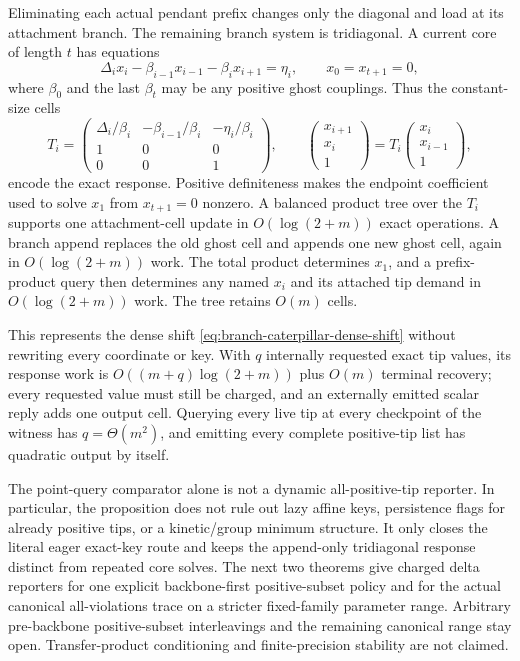 \begin{remark}
\label{rem:branch-caterpillar-implicit-transfer-comparator}
Eliminating each actual pendant prefix changes only the diagonal and load at
its attachment branch.  The remaining branch system is tridiagonal.  A
current core of length $t$ has equations
\begin{equation*}
 \Delta_i x_i-\beta_{i-1}x_{i-1}-\beta_i x_{i+1}=\eta_i,
 \qquad x_0=x_{t+1}=0,
\end{equation*}
where $\beta_0$ and the last $\beta_t$ may be any positive ghost couplings.
Thus the
constant-size cells
\begin{equation*}
 T_i=
 \begin{pmatrix}
  \Delta_i/\beta_i&-\beta_{i-1}/\beta_i&-\eta_i/\beta_i\\
  1&0&0\\0&0&1
 \end{pmatrix},
 \qquad
 \begin{pmatrix}x_{i+1}\\x_i\\1\end{pmatrix}
 =T_i\begin{pmatrix}x_i\\x_{i-1}\\1\end{pmatrix},
\end{equation*}
encode the exact response.  Positive definiteness makes the endpoint
coefficient used to solve $x_1$ from $x_{t+1}=0$ nonzero.  A balanced product
tree over the $T_i$ supports one attachment-cell update in
$O(\log(2+m))$ exact operations.  A branch append replaces the old ghost cell
and appends one new ghost cell, again in $O(\log(2+m))$ work.  The total
product determines $x_1$, and a prefix-product query then determines any named
$x_i$ and its attached tip demand in $O(\log(2+m))$ work.  The tree retains
$O(m)$ cells.

This represents the dense shift
\eqref{eq:branch-caterpillar-dense-shift} without rewriting every coordinate
or key.  With $q$ internally requested exact tip values, its response work is
$O((m+q)\log(2+m))$ plus $O(m)$ terminal recovery; every requested value must
still be charged, and an externally emitted scalar reply adds one output
cell.  Querying every live tip at every checkpoint of the witness has
$q=\Theta(m^2)$, and emitting every complete positive-tip list has quadratic
output by itself.

The point-query comparator alone is not a dynamic all-positive-tip reporter.
In particular, the proposition does not rule out lazy affine keys,
persistence flags for already positive tips, or a kinetic/group minimum
structure.  It only closes the literal eager exact-key route and keeps the
append-only tridiagonal response distinct from repeated core solves.  The
next two theorems give charged delta reporters for one explicit
backbone-first positive-subset policy and for the actual canonical
all-violations trace on a stricter fixed-family parameter range.  Arbitrary
pre-backbone positive-subset interleavings and the remaining canonical range
stay open.  Transfer-product conditioning and finite-precision stability are
not claimed.
\end{remark}

